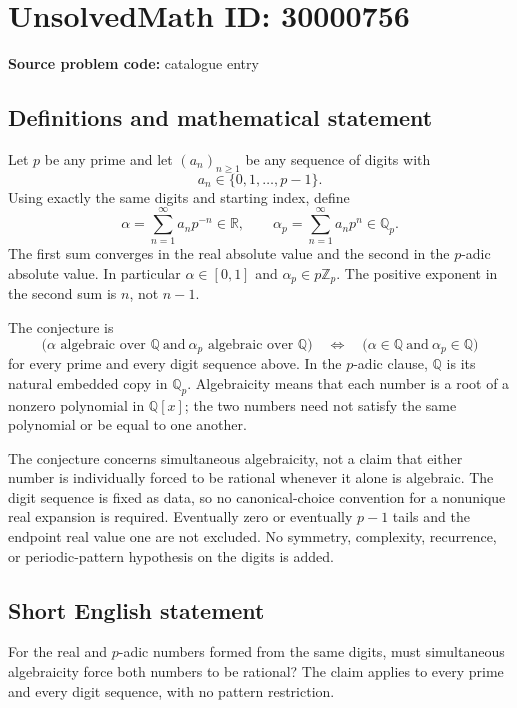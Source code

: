 \documentclass[11pt]{article}
\newcommand{\Z}{\mathbb{Z}}
\newcommand{\Q}{\mathbb{Q}}
\newcommand{\R}{\mathbb{R}}
\begin{document}
\section*{UnsolvedMath ID: 30000756}
\textbf{Source problem code:} catalogue entry
\subsection{Definitions and mathematical statement}
Let $p$ be any prime and let $(a_n)_{n\ge1}$ be any sequence of digits with
\[
 a_n\in\{0,1,\ldots,p-1\}.
\]
Using exactly the same digits and starting index, define
\[
 \alpha=\sum_{n=1}^{\infty}a_np^{-n}\in\R,
 \qquad
 \alpha_p=\sum_{n=1}^{\infty}a_np^n\in\Q_p.
\]
The first sum converges in the real absolute value and the second in the $p$-adic absolute value. In particular $\alpha\in[0,1]$ and $\alpha_p\in p\Z_p$. The positive exponent in the second sum is $n$, not $n-1$.

The conjecture is
\[
 \bigl(\alpha\text{ algebraic over }\Q\ \text{and}\
       \alpha_p\text{ algebraic over }\Q\bigr)
 \quad\Longleftrightarrow\quad
 \bigl(\alpha\in\Q\ \text{and}\ \alpha_p\in\Q\bigr)
\]
for every prime and every digit sequence above. In the $p$-adic clause, $\Q$ is its natural embedded copy in $\Q_p$. Algebraicity means that each number is a root of a nonzero polynomial in $\Q[x]$; the two numbers need not satisfy the same polynomial or be equal to one another.

The conjecture concerns simultaneous algebraicity, not a claim that either number is individually forced to be rational whenever it alone is algebraic. The digit sequence is fixed as data, so no canonical-choice convention for a nonunique real expansion is required. Eventually zero or eventually $p-1$ tails and the endpoint real value one are not excluded. No symmetry, complexity, recurrence, or periodic-pattern hypothesis on the digits is added.
\subsection{Short English statement}
For the real and $p$-adic numbers formed from the same digits, must simultaneous algebraicity force both numbers to be rational? The claim applies to every prime and every digit sequence, with no pattern restriction.
\end{document}
